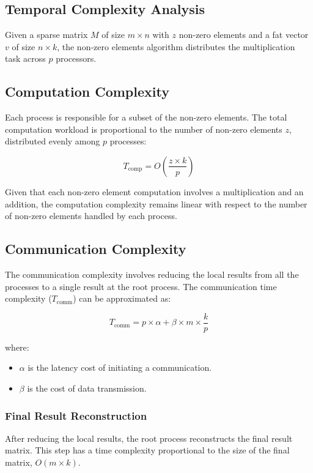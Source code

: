 \documentclass[12pt,oneside]{book} %
\begin{document}
\subsection{Temporal Complexity Analysis}
Given a sparse matrix $M$ of size $m \times n$ with $z$ non-zero elements and a
fat vector $v$ of size $n \times k$, the non-zero elements algorithm
distributes the multiplication task across $p$ processors.

\subsection{Computation Complexity}
Each process is responsible for a subset of the non-zero elements. The total
computation workload is proportional to the number of non-zero elements \(z\),
distributed evenly among \(p\) processes:

\begin{equation}
    T_{\text{comp}} = O\left(\frac{z \times k}{p}\right)
\end{equation}

Given that each non-zero element computation involves a multiplication and an
addition, the computation complexity remains linear with respect to the number
of non-zero elements handled by each process.

\subsection{Communication Complexity}
The communication complexity involves reducing the local results from all the
processes to a single result at the root process. The communication time
complexity (\(T_{\text{comm}}\)) can be approximated as:

\begin{equation}
    T_{\text{comm}} = p \times \alpha + \beta \times m \times \frac{k}{p}
\end{equation}

where:
\begin{itemize}
    \item \(\alpha\) is the latency cost of initiating a communication.
    \item \(\beta\) is the cost of data transmission.
\end{itemize}

\subsubsection{Final Result Reconstruction}
After reducing the local results, the root process reconstructs the final
result matrix. This step has a time complexity proportional to the size of the
final matrix, \(O(m \times k)\).
\end{document}
